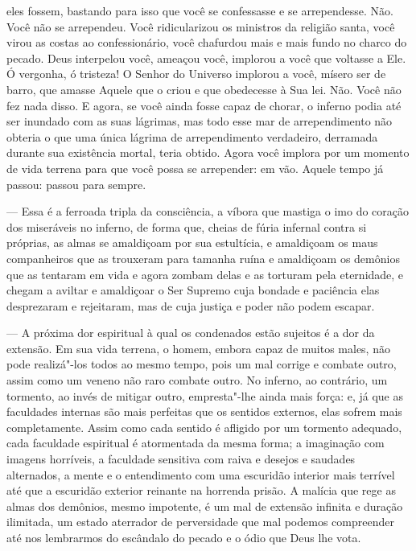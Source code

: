 eles fossem, bastando para isso que você se confessasse e se
arrependesse. Não. Você não se arrependeu. Você ridicularizou os
ministros da religião santa, você virou as costas ao confessionário,
você chafurdou mais e mais fundo no charco do pecado. Deus interpelou
você, ameaçou você, implorou a você que voltasse a Ele. Ó vergonha, ó
tristeza! O Senhor do Universo implorou a você, mísero ser de barro,
que amasse Aquele que o criou e que obedecesse à Sua lei. Não. Você não
fez nada disso. E agora, se você ainda fosse capaz de chorar, o inferno
podia até ser inundado com as suas lágrimas, mas todo esse mar de
arrependimento não obteria o que uma única lágrima de arrependimento
verdadeiro, derramada durante sua existência mortal, teria obtido.
Agora você implora por um momento de vida terrena para que você possa
se arrepender: em vão. Aquele tempo já passou: passou para sempre.

--- Essa é a ferroada tripla da consciência, a víbora que mastiga o imo do
coração dos miseráveis no inferno, de forma que, cheias de fúria
infernal contra si próprias, as almas se amaldiçoam por sua estultícia,
e amaldiçoam os maus companheiros que as trouxeram para tamanha ruína e
amaldiçoam os demônios que as tentaram em vida e agora zombam delas e
as torturam pela eternidade, e chegam a aviltar e amaldiçoar o Ser
Supremo cuja bondade e paciência elas desprezaram e rejeitaram, mas de
cuja justiça e poder não podem escapar.

 --- A próxima dor espiritual à qual os condenados estão sujeitos é a dor
da extensão. Em sua vida terrena, o homem, embora capaz de muitos
males, não pode realizá"-los todos ao mesmo tempo, pois um mal corrige e
combate outro, assim como um veneno não raro combate outro. No inferno,
ao contrário, um tormento, ao invés de mitigar outro, empresta"-lhe ainda mais
força: e, já que as faculdades internas são mais perfeitas que os
sentidos externos, elas sofrem mais completamente. Assim como cada
sentido é afligido por um tormento adequado, cada faculdade espiritual
é atormentada da mesma forma; a imaginação com imagens horríveis, a
faculdade sensitiva com raiva e desejos e saudades alternados, a mente
e o entendimento com uma escuridão interior mais terrível até que a
escuridão exterior reinante na horrenda prisão. A malícia que rege as
almas dos demônios, mesmo impotente, é um mal de extensão infinita e
duração ilimitada, um estado aterrador de perversidade que mal podemos
compreender até nos lembrarmos do escândalo do pecado e o ódio que Deus
lhe vota.

